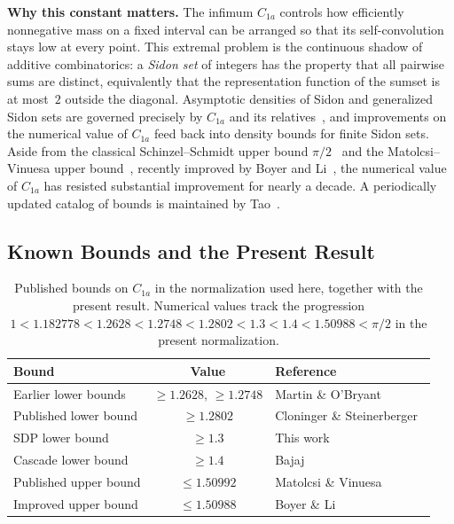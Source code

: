 \documentclass[11pt, letterpaper]{article}
\theoremstyle{paperplain}
\theoremstyle{paperdef}
\begin{document}
\medskip

\noindent\textbf{Why this constant matters.}  The infimum $C_{1a}$
controls how efficiently nonnegative mass on a fixed interval can be
arranged so that its self-convolution stays low at every point.  This
extremal problem is the continuous shadow of additive
combinatorics: a \emph{Sidon set} of integers has the property that all
pairwise sums are distinct, equivalently that the representation
function of the sumset is at most~$2$ outside the diagonal.  Asymptotic
densities of Sidon and generalized Sidon sets are governed precisely by
$C_{1a}$ and its relatives~\cite{ET41,MO2004,MO2006,MO2009,CRV10,CS17},
and improvements on the numerical value of $C_{1a}$ feed back into
density bounds for finite Sidon sets.  Aside from the classical
Schinzel--Schmidt upper bound $\pi/2$~\cite{SS2002} and the
Matolcsi--Vinuesa upper bound~\cite{MV10}, recently improved by Boyer
and Li~\cite{BL25}, the numerical value of $C_{1a}$ has resisted
substantial improvement for nearly a decade.  A periodically updated
catalog of bounds is maintained by Tao~\cite{Tao}.

\subsection{Known Bounds and the Present Result}

\begin{table}[t]
\centering
\begin{tabular}{lcl}
  \toprule
  \textbf{Bound} & \textbf{Value} & \textbf{Reference} \\
  \midrule
  Earlier lower bounds  & $\ge 1.2628$, $\ge 1.2748$  & Martin \& O'Bryant~\cite{MO2004,MO2009} \\
  Published lower bound & $\ge 1.2802$  & Cloninger \& Steinerberger~\cite{CS17} \\
  SDP lower bound       & $\ge 1.3$     & This work \\
  Cascade lower bound   & $\ge 1.4$     & Bajaj~\cite{BajajCS2026} \\
  Published upper bound & $\le 1.50992$ & Matolcsi \& Vinuesa~\cite{MV10} \\
  Improved upper bound  & $\le 1.50988$ & Boyer \& Li~\cite{BL25} \\
  \bottomrule
\end{tabular}
\caption[Published bounds on C1a in the normalization used here.]{Published bounds on $C_{1a}$ in the normalization used here,
  together with the present result.  Numerical values track the
  progression $1<1.182778<1.2628<1.2748<1.2802<1.3<1.4<1.50988<\pi/2$
  in the present normalization.}
\label{tab:published-bounds}
\end{table}
\end{document}
